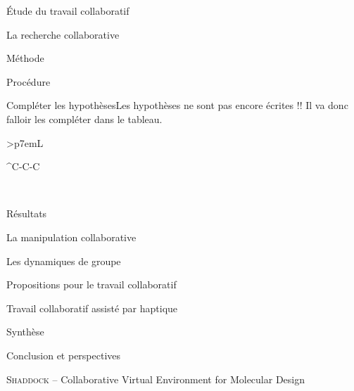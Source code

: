 \documentclass[myfrancais]{mythesis}
\begin{document}
\begin{mypart}{Étude du travail collaboratif}
\begin{mychapter}{La recherche collaborative}
\begin{mysection}{Méthode}
\begin{mysubsection}{Procédure}
\begin{myTodo}{Compléter les hypothèses}{Les hypothèses ne sont pas encore écrites !! Il va donc falloir les compléter dans le tableau.}
\begin{mytable}
\begin{mytabular}{>{\bfseries}p{7em}L}
{\begin{tabular}{^C-C-C}
									\end{tabular}
								} \\
								\mybottomrule
							\end{mytabular}
						\end{mytable}
					\end{myTodo}
				\end{mysubsection}
			\end{mysection}
			\begin{mysection}{Résultats}
			\end{mysection}
		\end{mychapter}
		\begin{mychapter}{La manipulation collaborative}
		\end{mychapter}
		\begin{mychapter}{Les dynamiques de groupe}
		\end{mychapter}
	\end{mypart}
	\begin{mypart}{Propositions pour le travail collaboratif}
		\begin{mychapter}{Travail collaboratif assisté par haptique}
		\end{mychapter}
	\end{mypart}
	\begin{mypart}{Synthèse}
		\begin{mychapter}{Conclusion et perspectives}
		\end{mychapter}
	\end{mypart}

	\myglossary
	\appendix
	\begin{mychapter}{\textsc{Shaddock} -- Collaborative Virtual Environment for Molecular Design}
	\end{mychapter}
\end{document}
